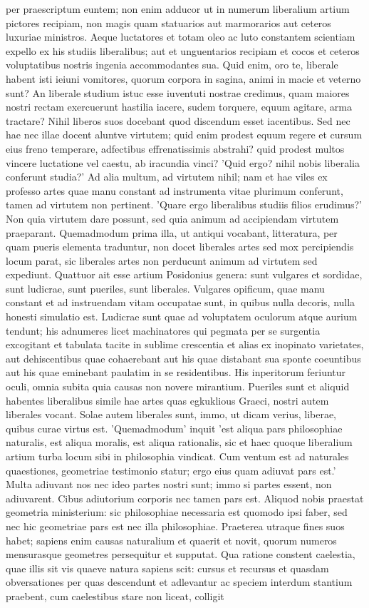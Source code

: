 per praescriptum euntem; non enim adducor ut in numerum liberalium artium pictores recipiam, non magis quam statuarios aut marmorarios aut ceteros luxuriae ministros. Aeque luctatores et totam oleo ac luto constantem scientiam expello ex his studiis liberalibus; aut et unguentarios recipiam et cocos et ceteros voluptatibus nostris ingenia accommodantes sua. Quid enim, oro te, liberale habent isti ieiuni vomitores, quorum corpora in sagina, animi in macie et veterno sunt? An liberale studium istuc esse iuventuti nostrae credimus, quam maiores nostri rectam exercuerunt hastilia iacere, sudem torquere, equum agitare, arma tractare? Nihil liberos suos docebant quod discendum esset iacentibus. Sed nec hae nec illae docent aluntve virtutem; quid enim prodest equum regere et cursum eius freno temperare, adfectibus effrenatissimis abstrahi? quid prodest multos vincere luctatione vel caestu, ab iracundia vinci? 'Quid ergo? nihil nobis liberalia conferunt studia?' Ad alia multum, ad virtutem nihil; nam et hae viles ex professo artes quae manu constant ad instrumenta vitae plurimum conferunt, tamen ad virtutem non pertinent. 'Quare ergo liberalibus studiis filios erudimus?' Non quia virtutem dare possunt, sed quia animum ad accipiendam virtutem praeparant. Quemadmodum prima illa, ut antiqui vocabant, litteratura, per quam pueris elementa traduntur, non docet liberales artes sed mox percipiendis locum parat, sic liberales artes non perducunt animum ad virtutem sed expediunt. Quattuor ait esse artium Posidonius genera: sunt vulgares et sordidae, sunt ludicrae, sunt pueriles, sunt liberales. Vulgares opificum, quae manu constant et ad instruendam vitam occupatae sunt, in quibus nulla decoris, nulla honesti simulatio est. Ludicrae sunt quae ad voluptatem oculorum atque aurium tendunt; his adnumeres licet machinatores qui pegmata per se surgentia excogitant et tabulata tacite in sublime crescentia et alias ex inopinato varietates, aut dehiscentibus quae cohaerebant aut his quae distabant sua sponte coeuntibus aut his quae eminebant paulatim in se residentibus. His inperitorum feriuntur oculi, omnia subita quia causas non novere mirantium. Pueriles sunt et aliquid habentes liberalibus simile hae artes quas egkuklious Graeci, nostri autem liberales vocant. Solae autem liberales sunt, immo, ut dicam verius, liberae, quibus curae virtus est. 'Quemadmodum' inquit 'est aliqua pars philosophiae naturalis, est aliqua moralis, est aliqua rationalis, sic et haec quoque liberalium artium turba locum sibi in philosophia vindicat. Cum ventum est ad naturales quaestiones, geometriae testimonio statur; ergo eius quam adiuvat pars est.' Multa adiuvant nos nec ideo partes nostri sunt; immo si partes essent, non adiuvarent. Cibus adiutorium corporis nec tamen pars est. Aliquod nobis praestat geometria ministerium: sic philosophiae necessaria est quomodo ipsi faber, sed nec hic geometriae pars est nec illa philosophiae. Praeterea utraque fines suos habet; sapiens enim causas naturalium et quaerit et novit, quorum numeros mensurasque geometres persequitur et supputat. Qua ratione constent caelestia, quae illis sit vis quaeve natura sapiens scit: cursus et recursus et quasdam obversationes per quas descendunt et adlevantur ac speciem interdum stantium praebent, cum caelestibus stare non liceat, colligit 